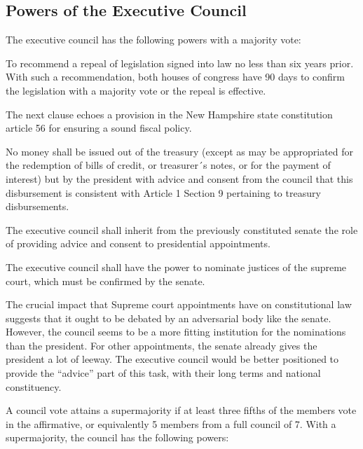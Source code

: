 \documentclass{article}
\begin{document}
\subsection{Powers of the Executive Council}

\begin{quoting}
The executive council has the following powers with a majority vote:

To recommend a repeal of legislation signed into law no less than six years prior. With such a recommendation, both houses of congress have 90 days to confirm the legislation with a majority vote or the repeal is effective.
\end{quoting}

The next clause echoes a provision in the New Hampshire state constitution article 56\cite{New Hampshire Constitution} for ensuring a sound fiscal policy.

\begin{quoting}
No money shall be issued out of the treasury (except as may be appropriated for the redemption of bills of credit, or treasurer´s notes, or for the payment of interest) but by the president with advice and consent from the council that this disbursement is consistent with Article 1 Section 9 pertaining to treasury disbursements.

The executive council shall inherit from the previously constituted senate the role of providing advice and consent to presidential appointments.

The executive council shall have the power to nominate justices of the supreme court, which must be confirmed by the senate.
\end{quoting}

The crucial impact that Supreme court appointments have on constitutional law suggests that it ought to be debated by an adversarial body like the senate. However, the council seems to be a more fitting institution for the nominations than the president. For other appointments, the senate already gives the president a lot of leeway. The executive council would be better positioned to provide the “advice” part of this task, with their long terms and national constituency.

\begin{quoting}
A council vote attains a supermajority if at least three fifths of the members vote in the affirmative, or equivalently 5 members from a full council of 7. With a supermajority, the council has the following powers:
\end{quoting}
\end{document}
